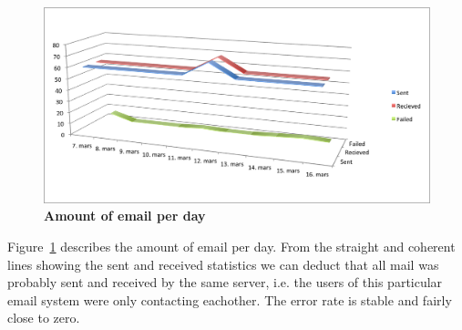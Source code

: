 \begin{figure}[h!]
  \begin{center}
    \includegraphics[scale=0.70]{img/sent-received-failed.png}
  \end{center}
  \caption{\bf{Amount of email per day}}
  \label{fig:amount}
\end{figure}
Figure~\ref{fig:amount} describes the amount of email per day. From the
straight and coherent lines showing the sent and received statistics we
can deduct that all mail was probably sent and received by the same
server, i.e. the users of this particular email system were only
contacting eachother. The error rate is stable and fairly close to
zero.\newline
